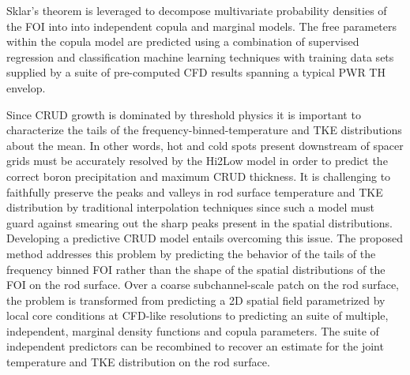 Sklar's theorem is leveraged to decompose multivariate probability
densities of the FOI into into independent copula and marginal models. The free parameters
within the copula model are predicted using a combination of supervised
regression and classification machine learning techniques with training data
sets supplied by a suite of pre-computed CFD results spanning a typical PWR TH
envelop. 

Since CRUD growth is dominated by threshold physics
it is important to characterize the tails of the
frequency-binned-temperature and TKE distributions about the mean.  In other
words, hot and cold spots present downstream of spacer grids must be accurately
resolved by the Hi2Low model in order to predict the correct boron
precipitation and maximum CRUD thickness.
It is challenging to faithfully
preserve the peaks and valleys in rod surface temperature and TKE distribution
by traditional interpolation techniques since such a model must guard against
smearing out the sharp peaks present in the spatial distributions.  Developing
a predictive CRUD model entails overcoming this issue. The proposed method
addresses this problem by predicting the behavior of the tails of the frequency
binned FOI rather than the shape of the spatial distributions of the FOI on
the rod surface.  Over a coarse subchannel-scale patch on the rod surface, the
problem is transformed from predicting a 2D spatial field parametrized by local core conditions at CFD-like resolutions to
predicting an suite of multiple, independent, marginal density functions and copula parameters.  The suite of independent predictors can be recombined to recover an estimate for the joint temperature and TKE distribution on the rod surface.
